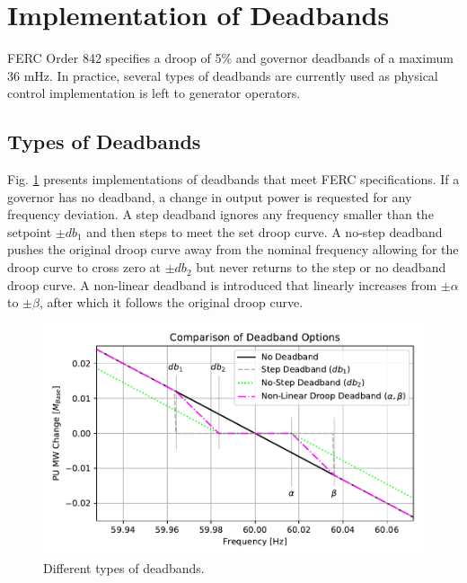 \section{Implementation of Deadbands}
FERC Order 842 specifies a droop of 5\% and governor deadbands of a maximum 36 mHz\cite{ferc2018}.
In practice, several types of deadbands are currently used as physical control implementation is left to generator operators.

\subsection{Types of Deadbands}
Fig. \ref{fig: deadbandType} presents implementations of deadbands that meet FERC specifications.
If a governor has no deadband, a change in output power is requested for any frequency deviation.
A step deadband ignores any frequency smaller than the setpoint $\pm db_1$ and then steps to meet the set droop curve.
A no-step deadband pushes the original droop curve away from the nominal frequency allowing for the droop curve to cross zero at $\pm db_2$ but never returns to the step or no deadband droop curve.
A non-linear deadband is introduced that linearly increases from $\pm \alpha$ to $\pm \beta$, after which it follows the original droop curve.

\begin{figure}[!ht]
	\centering
	\includegraphics[width=\linewidth]{figures/db}
	\caption{Different types of deadbands.}
	\label{fig: deadbandType}
\end{figure}